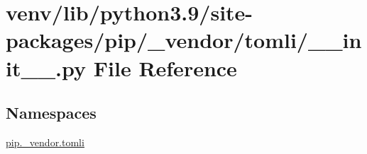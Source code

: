 \hypertarget{venv_2lib_2python3_89_2site-packages_2pip_2__vendor_2tomli_2____init_____8py}{}\section{venv/lib/python3.9/site-\/packages/pip/\+\_\+vendor/tomli/\+\_\+\+\_\+init\+\_\+\+\_\+.py File Reference}
\label{venv_2lib_2python3_89_2site-packages_2pip_2__vendor_2tomli_2____init_____8py}
\subsection*{Namespaces}
\begin{DoxyCompactItemize}
\item 
 \hyperlink{namespacepip_1_1__vendor_1_1tomli}{pip.\+\_\+vendor.\+tomli}
\end{DoxyCompactItemize}
